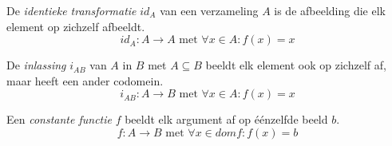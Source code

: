 \documentclass[main.tex]{subfiles}
\begin{document}
\begin{de}
  De \emph{identieke transformatie} $id_{A}$ van een verzameling $A$ is de afbeelding die elk element op zichzelf afbeeldt.
  \[ id_{A}: A \rightarrow A \text{ met } \forall x \in A: f(x) = x \]
\end{de}

\begin{de}
  De \emph{inlassing} $i_{AB}$ van $A$ in $B$ met $A \subseteq B$ beeldt elk element ook op zichzelf af, maar heeft een ander codomein.
  \[ i_{AB}: A \rightarrow B \text{ met } \forall x \in A: f(x) = x \]
\end{de}

\begin{de}
  Een \emph{constante functie} $f$ beeldt elk argument af op \'e\'enzelfde beeld $b$.
  \[ f: A \rightarrow B \text{ met } \forall x \in dom f: f(x) = b \]
\end{de}
\end{document}
